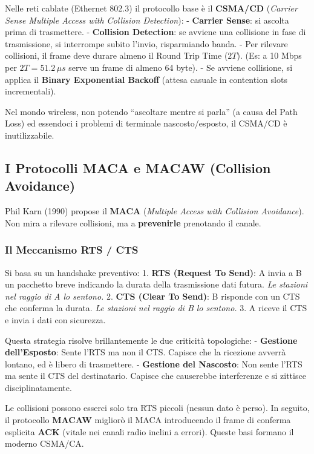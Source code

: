 \documentclass[
  italian,
  openany]{book}
\begin{document}
Nelle reti cablate (Ethernet 802.3) il protocollo base è il
\textbf{CSMA/CD} (\emph{Carrier Sense Multiple Access with Collision
Detection}): - \textbf{Carrier Sense}: si ascolta prima di trasmettere.
- \textbf{Collision Detection}: se avviene una collisione in fase di
trasmissione, si interrompe subito l'invio, risparmiando banda. - Per
rilevare collisioni, il frame deve durare almeno il Round Trip Time
(\(2T\)). (Es: a 10 Mbps per \(2T = 51.2\,\mu s\) serve un frame di
almeno 64 byte). - Se avviene collisione, si applica il \textbf{Binary
Exponential Backoff} (attesa casuale in contention slots incrementali).

Nel mondo wireless, non potendo ``ascoltare mentre si parla'' (a causa
del Path Loss) ed essendoci i problemi di terminale nascosto/esposto, il
CSMA/CD è inutilizzabile.

\subsection{I Protocolli MACA e MACAW (Collision
Avoidance)}\label{i-protocolli-maca-e-macaw-collision-avoidance}

Phil Karn (1990) propose il \textbf{MACA} (\emph{Multiple Access with
Collision Avoidance}). Non mira a rilevare collisioni, ma a
\textbf{prevenirle} prenotando il canale.

\subsubsection{Il Meccanismo RTS / CTS}\label{il-meccanismo-rts-cts}

Si basa su un handshake preventivo: 1. \textbf{RTS (Request To Send)}: A
invia a B un pacchetto breve indicando la durata della trasmissione dati
futura. \emph{Le stazioni nel raggio di A lo sentono.} 2. \textbf{CTS
(Clear To Send)}: B risponde con un CTS che conferma la durata. \emph{Le
stazioni nel raggio di B lo sentono.} 3. A riceve il CTS e invia i dati
con sicurezza.

Questa strategia risolve brillantemente le due criticità topologiche: -
\textbf{Gestione dell'Esposto}: Sente l'RTS ma non il CTS. Capisce che
la ricezione avverrà lontano, ed è libero di trasmettere. -
\textbf{Gestione del Nascosto}: Non sente l'RTS ma sente il CTS del
destinatario. Capisce che causerebbe interferenze e si zittisce
disciplinatamente.

Le collisioni possono esserci solo tra RTS piccoli (nessun dato è
perso). In seguito, il protocollo \textbf{MACAW} migliorò il MACA
introducendo il frame di conferma esplicita \textbf{ACK} (vitale nei
canali radio inclini a errori). Queste basi formano il moderno CSMA/CA.
\end{document}
